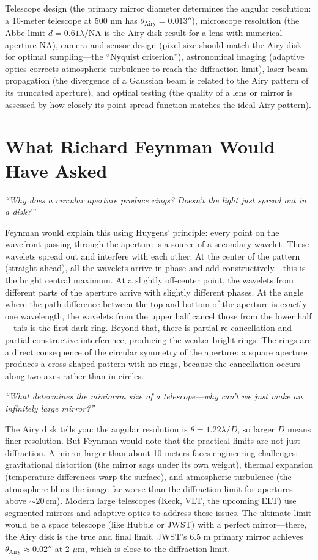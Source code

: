 Telescope design (the primary mirror diameter determines the angular resolution: a 10-meter telescope at 500 nm has $\theta_{\text{Airy}} = 0.013''$), microscope resolution (the Abbe limit $d = 0.61\lambda/\text{NA}$ is the Airy-disk result for a lens with numerical aperture NA), camera and sensor design (pixel size should match the Airy disk for optimal sampling---the ``Nyquist criterion''), astronomical imaging (adaptive optics corrects atmospheric turbulence to reach the diffraction limit), laser beam propagation (the divergence of a Gaussian beam is related to the Airy pattern of its truncated aperture), and optical testing (the quality of a lens or mirror is assessed by how closely its point spread function matches the ideal Airy pattern).
\section*{What Richard Feynman Would Have Asked}

\textit{``Why does a circular aperture produce rings? Doesn't the light just spread out in a disk?''}

Feynman would explain this using Huygens' principle: every point on the wavefront passing through the aperture is a source of a secondary wavelet. These wavelets spread out and interfere with each other. At the center of the pattern (straight ahead), all the wavelets arrive in phase and add constructively---this is the bright central maximum. At a slightly off-center point, the wavelets from different parts of the aperture arrive with slightly different phases. At the angle where the path difference between the top and bottom of the aperture is exactly one wavelength, the wavelets from the upper half cancel those from the lower half---this is the first dark ring. Beyond that, there is partial re-cancellation and partial constructive interference, producing the weaker bright rings. The rings are a direct consequence of the circular symmetry of the aperture: a square aperture produces a cross-shaped pattern with no rings, because the cancellation occurs along two axes rather than in circles.

\textit{``What determines the minimum size of a telescope---why can't we just make an infinitely large mirror?''}

The Airy disk tells you: the angular resolution is $\theta = 1.22\lambda/D$, so larger $D$ means finer resolution. But Feynman would note that the practical limits are not just diffraction. A mirror larger than about 10 meters faces engineering challenges: gravitational distortion (the mirror sags under its own weight), thermal expansion (temperature differences warp the surface), and atmospheric turbulence (the atmosphere blurs the image far worse than the diffraction limit for apertures above $\sim 20\,\text{cm}$). Modern large telescopes (Keck, VLT, the upcoming ELT) use segmented mirrors and adaptive optics to address these issues. The ultimate limit would be a space telescope (like Hubble or JWST) with a perfect mirror---there, the Airy disk is the true and final limit. JWST's 6.5 m primary mirror achieves $\theta_{\text{Airy}} \approx 0.02''$ at 2 $\mu$m, which is close to the diffraction limit.

